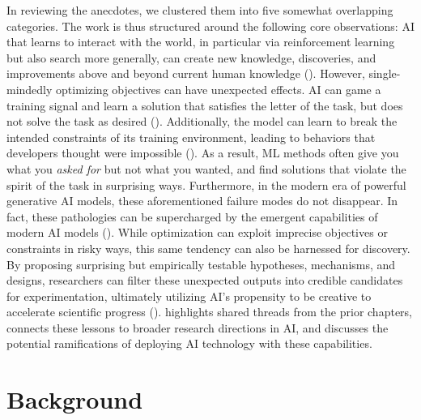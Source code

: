 \documentclass[10pt]{article}
\begin{document}
In reviewing the anecdotes, we clustered them into five somewhat overlapping categories. 
The work is thus structured around the following core observations:
AI that learns to interact with the world, in particular via reinforcement learning but also search more generally, can create new knowledge, discoveries, and improvements above and beyond current human knowledge ().
However, single-mindedly optimizing objectives can have unexpected effects.
AI can game a training signal and learn a solution that satisfies the letter of the task, but does not solve the task as desired (). 
Additionally, the model can learn to break the intended constraints of its training environment, leading to behaviors that developers thought were impossible (). 
As a result, ML methods often give you what you \textit{asked for} but not what you wanted, and find solutions that violate the spirit of the task in surprising ways.
Furthermore, in the modern era of powerful generative AI models, these aforementioned failure modes do not disappear. In fact, these pathologies can be supercharged by the emergent capabilities of modern AI models ().
While optimization can exploit imprecise objectives or constraints in risky ways, this same tendency can also be harnessed for discovery. 
By proposing surprising but empirically testable hypotheses, mechanisms, and designs, researchers can filter these unexpected outputs into credible candidates for experimentation, ultimately utilizing AI's propensity to be creative to accelerate scientific progress ().
 highlights shared threads from the prior chapters, connects these lessons to broader research directions in AI, and discusses the potential ramifications of deploying AI technology with these capabilities.

\section{Background}
\label{sec:background}
\end{document}
